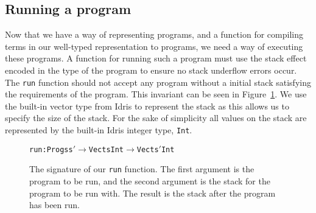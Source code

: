 \subsection{Running a program}
\label{sec:running_a_program}
Now that we have a way of representing programs, and a function for compiling terms in our well-typed representation to programs, we need a way of executing these programs. A function for running such a program must use the stack effect encoded in the type of the program to ensure no stack underflow errors occur. The \texttt{run} function should not accept any program without a initial stack satisfying the requirements of the program. This invariant can be seen in Figure~\ref{fig:run_function}. We use the built-in vector type from Idris to represent the stack as this allows us to specify the size of the stack. For the sake of simplicity all values on the stack are represented by the built-in Idris integer type, \texttt{Int}. 

\begin{figure}
\begin{alltt}
run : Prog s s\('\) \(\to\) Vect s Int \(\to\) Vect s\('\) Int
\end{alltt}
\caption{The signature of our \texttt{run} function. The first argument is the program to be run, and the second argument is the stack for the program to be run with. The result is the stack after the program has been run.}
\label{fig:run_function}
\end{figure}
